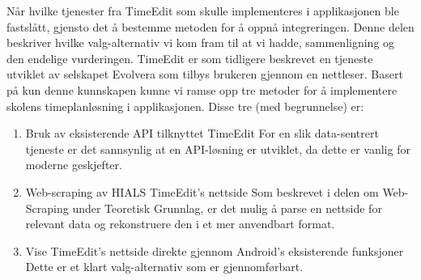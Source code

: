 \documentclass[../main.tex]{subfiles}
\begin{document}
Når hvilke tjenester fra TimeEdit som skulle implementeres i applikasjonen ble fastslått, gjensto det å bestemme metoden for å oppnå integreringen. Denne delen beskriver hvilke valg-alternativ vi kom fram til at vi hadde, sammenligning og den endelige vurderingen.\newline
\newline
TimeEdit er som tidligere beskrevet en tjeneste utviklet av selskapet Evolvera som tilbys brukeren gjennom en nettleser. Basert på kun denne kunnskapen kunne vi ramse opp tre metoder for å implementere skolens timeplanløsning i applikasjonen. Disse tre (med begrunnelse) er:
\begin{enumerate}
\item Bruk av eksisterende API tilknyttet TimeEdit\newline
For en slik data-sentrert tjeneste er det sannsynlig at en API-løsning er utviklet, da dette er vanlig for moderne geskjefter. 
\item Web-scraping av HIALS TimeEdit’s nettside\newline
Som beskrevet i delen om Web-Scraping under Teoretisk Grunnlag, er det mulig å parse en nettside for relevant data og rekonstruere den i et mer anvendbart format.
\item Vise TimeEdit’s nettside direkte gjennom Android’s eksisterende funksjoner\newline
Dette er et klart valg-alternativ som er gjennomførbart.
\end{enumerate}
\end{document}
